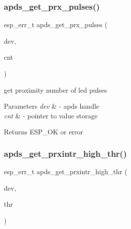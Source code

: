 \subsubsection{\texorpdfstring{apds\+\_\+get\+\_\+prx\+\_\+pulses()}{apds\_get\_prx\_pulses()}}
{\footnotesize\ttfamily esp\+\_\+err\+\_\+t apds\+\_\+get\+\_\+prx\+\_\+pulses (\begin{DoxyParamCaption}\item[{\hyperlink{structAPDS9960__Driver}{A\+P\+D\+S\+\_\+\+D\+EV}}]{dev,  }\item[{\hyperlink{vl53l0x__types_8h_aba7bc1797add20fe3efdf37ced1182c5}{uint8\+\_\+t} $\ast$}]{cnt }\end{DoxyParamCaption})}




\begin{DoxyItemize}
\item get proximity number of led pulses 
\end{DoxyItemize}


\begin{DoxyParams}{Parameters}
{\em dev} & -\/ apds handle \\
\hline
{\em cnt} & -\/ pointer to value storage \\
\hline
\end{DoxyParams}
\begin{DoxyReturn}{Returns}
E\+S\+P\+\_\+\+OK or error 
\end{DoxyReturn}
\mbox{\label{group__APDS9960__ProximityFunctions_ga3c0730e5329f2d87a45451710d919dca}} 
\subsubsection{\texorpdfstring{apds\+\_\+get\+\_\+prxintr\+\_\+high\+\_\+thr()}{apds\_get\_prxintr\_high\_thr()}}
{\footnotesize\ttfamily esp\+\_\+err\+\_\+t apds\+\_\+get\+\_\+prxintr\+\_\+high\+\_\+thr (\begin{DoxyParamCaption}\item[{\hyperlink{structAPDS9960__Driver}{A\+P\+D\+S\+\_\+\+D\+EV}}]{dev,  }\item[{\hyperlink{vl53l0x__types_8h_aba7bc1797add20fe3efdf37ced1182c5}{uint8\+\_\+t} $\ast$}]{thr }\end{DoxyParamCaption})}




